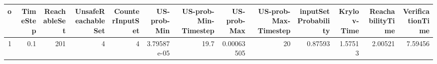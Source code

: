 \begin{tabular}{rrrrrrrrrrrrr}
\hline
   o &   TimeStep &   ReachableSet &   UnsafeReachableSet &   CounterInputSet &   US-prob-Min &   US-prob-Min-Timestep &   US-prob-Max &   US-prob-Max-Timestep &   inputSet Probability &   Krylov-Time &   ReachabilityTime &   VerificationTime \\
\hline
   1 &        0.1 &            201 &                    4 &                 4 &   3.79587e-05 &                   19.7 &    0.00063505 &                     20 &                0.87593 &       1.57513 &            2.00521 &            7.59456 \\
\hline
\end{tabular}
